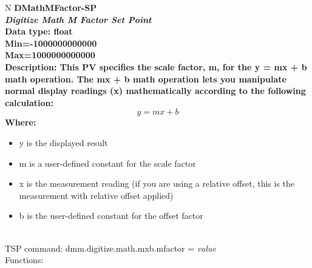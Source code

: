 \documentclass[openany]{article}
\begin{document}
		\begin{tabular}{N}
			\hline
			\bfseries DMathMFactor-SP\label{pv:dmathmfactor-sp} \\ \hline
			\emph{Digitize Math M Factor Set Point} \\
			Data type: float \\
			Min=-1000000000000 \\
			Max=1000000000000 \\
			Description: This PV specifies the scale factor, m, for the y = mx + b math operation. The mx + b math operation lets you manipulate normal display readings (x) mathematically according to the following calculation: $$ y = mx + b $$ Where: \begin{itemize} \item y is the displayed result \item m is a user-defined constant for the scale factor \item x is the measurement reading (if you are using a relative offset, this is the measurement with relative offset applied) \item b is the user-defined constant for the offset factor \end{itemize} \\
			TSP command: dmm.digitize.math.mxb.mfactor = \emph{value} \\
			Functions: \\
			\arrayrulecolor{\FuncTableBorderColor}

		\end{tabular}
\end{document}
